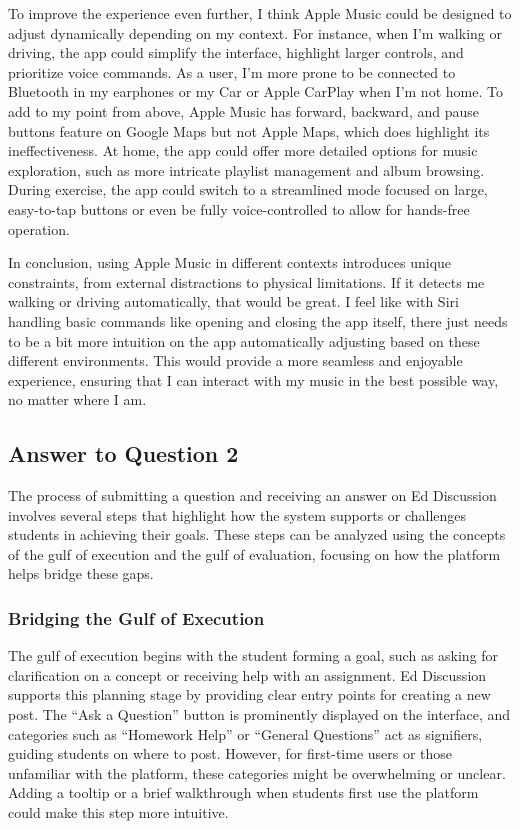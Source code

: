 \documentclass[
	letterpaper, %
]{jdf}
\begin{document}
To improve the experience even further, I think Apple Music could be designed to adjust dynamically depending on my context. For instance, when I’m walking or driving, the app could simplify the interface, highlight larger controls, and prioritize voice commands. As a user, I'm more prone to be connected to Bluetooth in my earphones or my Car or Apple CarPlay when I'm not home. To add to my point from above, Apple Music has forward, backward, and pause buttons feature on Google Maps but not Apple Maps, which does highlight its ineffectiveness. At home, the app could offer more detailed options for music exploration, such as more intricate playlist management and album browsing. During exercise, the app could switch to a streamlined mode focused on large, easy-to-tap buttons or even be fully voice-controlled to allow for hands-free operation.

In conclusion, using Apple Music in different contexts introduces unique constraints, from external distractions to physical limitations. If it detects me walking or driving automatically, that would be great. I feel like with Siri handling basic commands like opening and closing the app itself, there just needs to be a bit more intuition on the app automatically adjusting based on these different environments. This would provide a more seamless and enjoyable experience, ensuring that I can interact with my music in the best possible way, no matter where I am. 
\newpage

\subsection{Answer to Question 2}
The process of submitting a question and receiving an answer on Ed Discussion involves several steps that highlight how the system supports or challenges students in achieving their goals. These steps can be analyzed using the concepts of the gulf of execution and the gulf of evaluation, focusing on how the platform helps bridge these gaps.

\subsubsection {Bridging the Gulf of Execution}
The gulf of execution begins with the student forming a goal, such as asking for clarification on a concept or receiving help with an assignment. Ed Discussion supports this planning stage by providing clear entry points for creating a new post. The “Ask a Question” button is prominently displayed on the interface, and categories such as “Homework Help” or “General Questions” act as signifiers, guiding students on where to post. However, for first-time users or those unfamiliar with the platform, these categories might be overwhelming or unclear. Adding a tooltip or a brief walkthrough when students first use the platform could make this step more intuitive.
\end{document}
